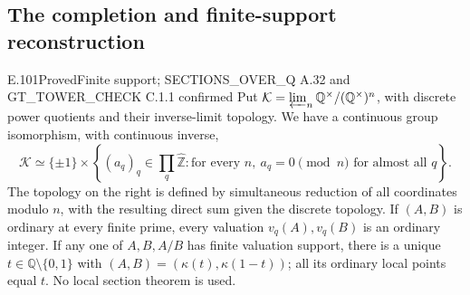 
\subsection{The completion and finite-support reconstruction}

\begin{result}{E.101}{Proved}{Finite support; SECTIONS\_OVER\_Q A.32 and GT\_TOWER\_CHECK C.1.1 confirmed}
Put $\mathcal K=\varprojlim_n\mathbb Q^\times/(\mathbb Q^\times)^n$,
with discrete power quotients and their inverse-limit topology. We have a
continuous group isomorphism, with continuous inverse,
\[
\mathcal K\simeq\{\pm1\}\times
\left\{(a_q)_q\in\prod_q\widehat{\mathbb Z}:
  \text{for every }n,\ a_q=0\pmod n\text{ for almost all }q\right\}.
\]
The topology on the right is defined by simultaneous reduction of all
coordinates modulo $n$, with the resulting direct sum given the discrete
topology. If $(A,B)$ is ordinary at every finite prime, every valuation
$v_q(A),v_q(B)$ is an ordinary integer. If any one of $A,B,A/B$ has finite
valuation support, there is a unique $t\in\mathbb Q\setminus\{0,1\}$ with
$(A,B)=(\kappa(t),\kappa(1-t))$; all its ordinary local points equal $t$.
No local section theorem is used.
\end{result}
